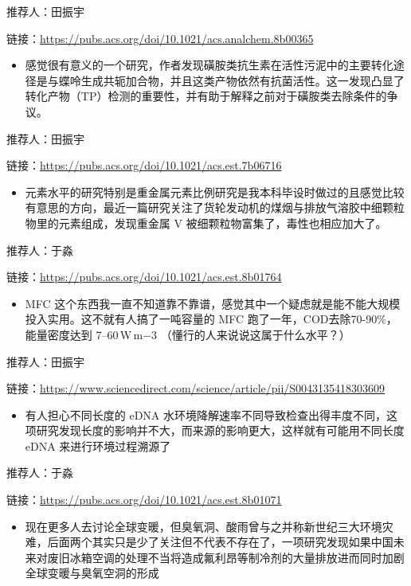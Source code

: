 \documentclass[]{book}
\providecommand{\tightlist}{%
  \setlength{\itemsep}{0pt}\setlength{\parskip}{0pt}}
\begin{document}
推荐人：田振宇

链接：\url{https://pubs.acs.org/doi/10.1021/acs.analchem.8b00365}

\begin{itemize}
\tightlist
\item
  感觉很有意义的一个研究，作者发现磺胺类抗生素在活性污泥中的主要转化途径是与蝶呤生成共轭加合物，并且这类产物依然有抗菌活性。这一发现凸显了转化产物（TP）检测的重要性，并有助于解释之前对于磺胺类去除条件的争议。
\end{itemize}

推荐人：田振宇

链接：\url{https://pubs.acs.org/doi/10.1021/acs.est.7b06716}

\begin{itemize}
\tightlist
\item
  元素水平的研究特别是重金属元素比例研究是我本科毕设时做过的且感觉比较有意思的方向，最近一篇研究关注了货轮发动机的煤烟与排放气溶胶中细颗粒物里的元素组成，发现重金属
  V 被细颗粒物富集了，毒性也相应加大了。
\end{itemize}

推荐人：于淼

链接：\url{https://pubs.acs.org/doi/10.1021/acs.est.8b01764}

\begin{itemize}
\tightlist
\item
  MFC
  这个东西我一直不知道靠不靠谱，感觉其中一个疑虑就是能不能大规模投入实用。这不就有人搞了一吨容量的
  MFC 跑了一年，COD去除70-90\%，能量密度达到 7--60\,W\,m−3
  （懂行的人来说说这属于什么水平？）
\end{itemize}

推荐人：田振宇

链接：\url{https://www.sciencedirect.com/science/article/pii/S0043135418303609}

\begin{itemize}
\tightlist
\item
  有人担心不同长度的 eDNA
  水环境降解速率不同导致检查出得丰度不同，这项研究发现长度的影响并不大，而来源的影响更大，这样就有可能用不同长度
  eDNA 来进行环境过程溯源了
\end{itemize}

推荐人：于淼

链接：\url{https://pubs.acs.org/doi/10.1021/acs.est.8b01071}

\begin{itemize}
\tightlist
\item
  现在更多人去讨论全球变暖，但臭氧洞、酸雨曾与之并称新世纪三大环境灾难，后面两个其实只是少了关注但不代表不存在了，一项研究发现如果中国未来对废旧冰箱空调的处理不当将造成氟利昂等制冷剂的大量排放进而同时加剧全球变暖与臭氧空洞的形成
\end{itemize}
\end{document}

